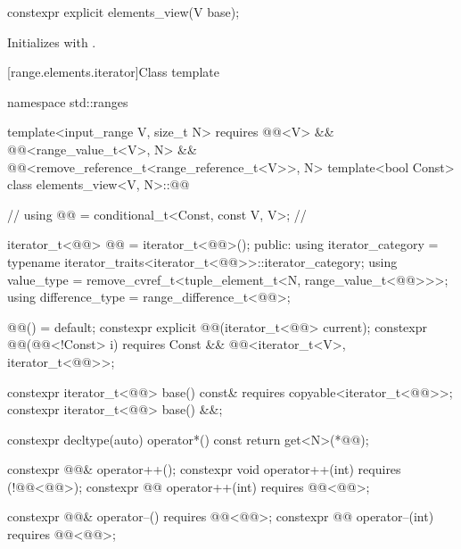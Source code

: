 %
\begin{itemdecl}
constexpr explicit elements_view(V base);
\end{itemdecl}

\begin{itemdescr}
\pnum
\effects
Initializes  with .
\end{itemdescr}

[range.elements.iterator]{Class template }

%
\begin{codeblock}
namespace std::ranges {
  template<input_range V, size_t N>
    requires @@<V> && @@<range_value_t<V>, N> &&
             @@<remove_reference_t<range_reference_t<V>>, N>
  template<bool Const>
  class elements_view<V, N>::@@ {                 // \expos
    using @@ = conditional_t<Const, const V, V>;      // \expos

    iterator_t<@@> @@ = iterator_t<@@>();
  public:
    using iterator_category = typename iterator_traits<iterator_t<@@>>::iterator_category;
    using value_type = remove_cvref_t<tuple_element_t<N, range_value_t<@@>>>;
    using difference_type = range_difference_t<@@>;

    @@() = default;
    constexpr explicit @@(iterator_t<@@> current);
    constexpr @@(@@<!Const> i)
      requires Const && @@<iterator_t<V>, iterator_t<@@>>;

    constexpr iterator_t<@@> base() const&
      requires copyable<iterator_t<@@>>;
    constexpr iterator_t<@@> base() &&;

    constexpr decltype(auto) operator*() const
    { return get<N>(*@@); }

    constexpr @@& operator++();
    constexpr void operator++(int) requires (!@@<@@>);
    constexpr @@ operator++(int) requires @@<@@>;

    constexpr @@& operator--() requires @@<@@>;
    constexpr @@ operator--(int) requires @@<@@>;

}}
\end{codeblock}
